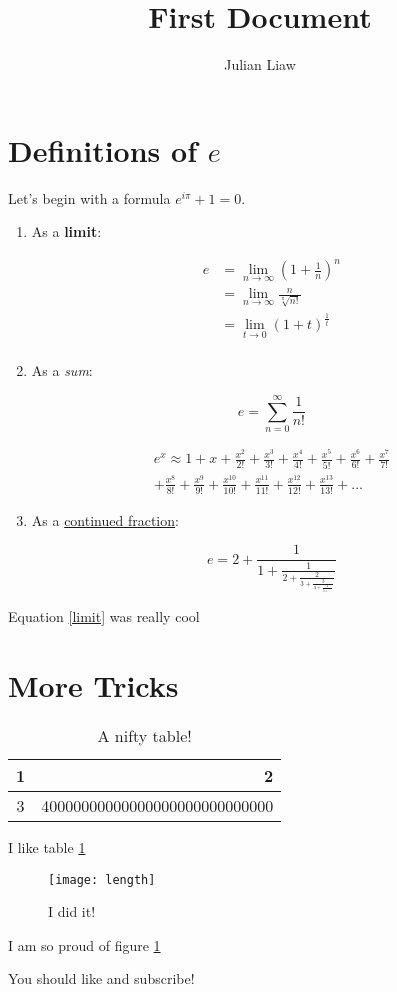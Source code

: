 \documentclass{article}
\title{First Document}
\author{Julian Liaw}
\begin{document}
\maketitle

\section*{Definitions of $e$}
Let's begin with a formula $e^{i\pi} + 1 = 0$. 

\begin{enumerate}
\item As a \textbf{limit}: 

\begin{equation} 
\begin{split}
\label{limit}
e &= \lim_{n\to\infty} \left(1+ \frac{1}{n}\right)^n \\ &= \lim_{n\to\infty}\frac{n}{\sqrt[n]{n!}} \\ &= \lim_{t \to 0}(1+t)^{\frac{1}{t}} \\
\end{split}
\end{equation}

\item As a \textit{sum}:

\[ e = \sum_{n=0}^{\infty} \frac{1}{n!} \]

\begin{multline}
e^x \approx 1 + x + \frac{x^2}{2!} + \frac{x^3}{3!} + \frac{x^4}{4!} + \frac{x^5}{5!} + \frac{x^6}{6!} + \frac{x^7}{7!} \\ + \frac{x^8}{8!} + \frac{x^9}{9!} + \frac{x^{10}}{10!} + \frac{x^{11}}{11!} + \frac{x^{12}}{12!} + \frac{x^{13}}{13!} + \dots
\end{multline}

\item As a \underline{continued fraction}:

\[ e = 2 + \frac{1}{1+\frac{1}{2+\frac{2}{3+\frac{3}{4+\frac{4}{5+\ddots}}}}} \]
\end{enumerate}

Equation \ref{limit} was really cool

\newpage
\section*{More Tricks}

\begin{table}
\caption{A nifty table!}
\label{niftytable}
\begin{center}
\begin{tabular}{| c | r |}
	\hline
	1 & 2 \\ \hline
	3 & 40000000000000000000000000000 \\ \hline
\end{tabular}
\end{center}
\end{table}

I like table \ref{niftytable}

\begin{figure}
	\centering
	\texttt{[image: length]}
	\caption{I did it!}
	\label{fig:length}
\end{figure}

I am so proud of figure \ref{fig:length}

\begin{example} You should like and subscribe!
\end{example}
\end{document}
